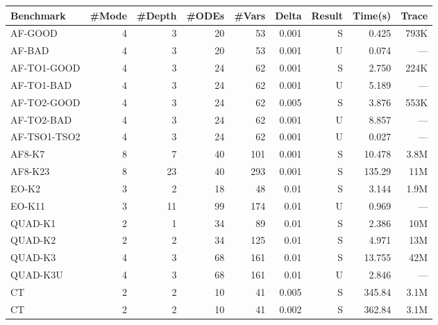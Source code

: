 \newcommand{\hmodel}[2]{\href{http://dreal.cs.cmu.edu/#1}{#2}}
{\small
\begin{table}[!th]
  \centering
  \small
  \begin{tabular}{l|r|r|r|r|r|r|r|r}
    \hline
    \hline
    Benchmark    & \#Mode& \#Depth & \#ODEs & \#Vars  & Delta  & Result       & Time(s) & Trace \\
    \hline
    \hline
      AF-GOOD & 4     & 3        & 20     & 53      & 0.001     & S &  0.425    & 793K     \\
       AF-BAD & 4     & 3        & 20     & 53      & 0.001     & U &  0.074    & ---      \\
  AF-TO1-GOOD & 4     & 3        & 24     & 62      & 0.001     & S &  2.750    & 224K     \\
   AF-TO1-BAD & 4     & 3        & 24     & 62      & 0.001     & U &  5.189    & ---     \\
  AF-TO2-GOOD & 4     & 3        & 24     & 62      & 0.005     & S &  3.876    & 553K     \\
   AF-TO2-BAD & 4     & 3        & 24     & 62      & 0.001     & U &  8.857    & ---     \\
 AF-TSO1-TSO2 & 4     & 3        & 24     & 62      & 0.001     & U &  0.027    & ---     \\
       AF8-K7 & 8     & 7        & 40     & 101     & 0.001     & S & 10.478   & 3.8M      \\
      AF8-K23 & 8     & 23       & 40     & 293     & 0.001     & S & 135.29   & 11M      \\
    \hline
    \hline
    EO-K2  & 3     & 2        & 18     & 48      & 0.01    & S & 3.144    & 1.9M      \\
    EO-K11 & 3     & 11       & 99     & 174     & 0.01    & U & 0.969    & ---       \\
    \hline
    \hline
    QUAD-K1  & 2   & 1          & 34     & 89      & 0.01      & S & 2.386 &  10M \\
    QUAD-K2  & 2   & 2          & 34     & 125     & 0.01      & S & 4.971 &  13M \\
    QUAD-K3  & 4   & 3          & 68     & 161     & 0.01      & S & 13.755 & 42M \\
    QUAD-K3U & 4   & 3          & 68     & 161     & 0.01      & U & 2.846 & --- \\
    \hline
    \hline
    CT       & 2   & 2         & 10      & 41      & 0.005     & S & 345.84 & 3.1M\\
    CT       & 2   & 2         & 10      & 41      & 0.002     & S & 362.84 & 3.1M\\

\end{tabular}
\end{table}}
